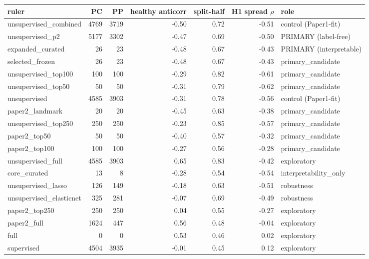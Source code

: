 \documentclass[11pt]{article}
\begin{document}
\begin{tabular}{l r r r r r l}
\hline
ruler & PC & PP & healthy anticorr & split-half & H1 spread $\rho$ & role \\
\hline
unsupervised\_combined & 4769 & 3719 & -0.50 & 0.72 & -0.51 & control (Paper1-fit) \\
unsupervised\_p2 & 5177 & 3302 & -0.47 & 0.69 & -0.50 & PRIMARY (label-free) \\
expanded\_curated & 26 & 23 & -0.48 & 0.67 & -0.43 & PRIMARY (interpretable) \\
selected\_frozen & 26 & 23 & -0.48 & 0.67 & -0.43 & primary\_candidate \\
unsupervised\_top100 & 100 & 100 & -0.29 & 0.82 & -0.61 & primary\_candidate \\
unsupervised\_top50 & 50 & 50 & -0.31 & 0.79 & -0.62 & primary\_candidate \\
unsupervised & 4585 & 3903 & -0.31 & 0.78 & -0.56 & control (Paper1-fit) \\
paper2\_landmark & 20 & 20 & -0.45 & 0.63 & -0.38 & primary\_candidate \\
unsupervised\_top250 & 250 & 250 & -0.23 & 0.85 & -0.57 & primary\_candidate \\
paper2\_top50 & 50 & 50 & -0.40 & 0.57 & -0.32 & primary\_candidate \\
paper2\_top100 & 100 & 100 & -0.27 & 0.56 & -0.28 & primary\_candidate \\
unsupervised\_full & 4585 & 3903 & 0.65 & 0.83 & -0.42 & exploratory \\
core\_curated & 13 & 8 & -0.28 & 0.54 & -0.54 & interpretability\_only \\
unsupervised\_lasso & 126 & 149 & -0.18 & 0.63 & -0.51 & robustness \\
unsupervised\_elasticnet & 325 & 281 & -0.07 & 0.69 & -0.49 & robustness \\
paper2\_top250 & 250 & 250 & 0.04 & 0.55 & -0.27 & exploratory \\
paper2\_full & 1624 & 447 & 0.56 & 0.48 & -0.04 & exploratory \\
full & 0 & 0 & 0.53 & 0.46 & 0.02 & exploratory \\
supervised & 4504 & 3935 & -0.01 & 0.45 & 0.12 & exploratory \\
\hline
\end{tabular}
\end{document}
